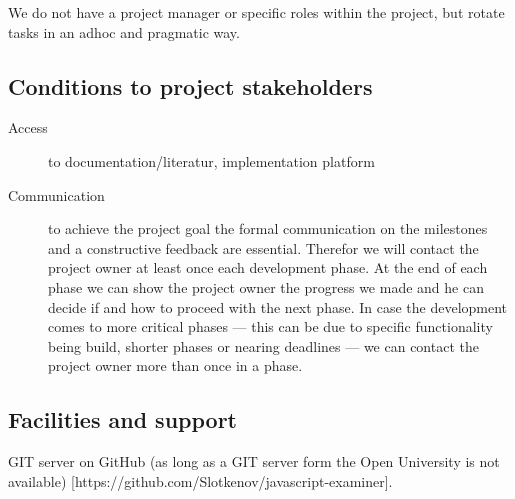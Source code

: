 \documentclass{article}
\begin{document}
We do not have a project manager or specific roles within the project, but 
rotate tasks in an adhoc and pragmatic way. 

\subsection{Conditions to project stakeholders} 

\begin{description}
  \item[Access]
    to documentation/literatur, implementation platform 
  \item[Communication]
    to achieve the project goal the formal communication on the milestones and
    a constructive feedback are essential. Therefor we will contact the project
    owner at least once each development phase. At the end of each phase we can
    show the project owner the progress we made and he can decide if and how to
    proceed with the next phase. In case the development comes to more critical
    phases --- this can be due to specific functionality being build, shorter
    phases or nearing deadlines --- we can contact the project owner more than
    once in a phase.
\end{description}

\subsection{Facilities and support}

GIT server on GitHub (as long as a GIT server form the Open University is not available) [https://github.com/Slotkenov/javascript-examiner].
\end{document}
